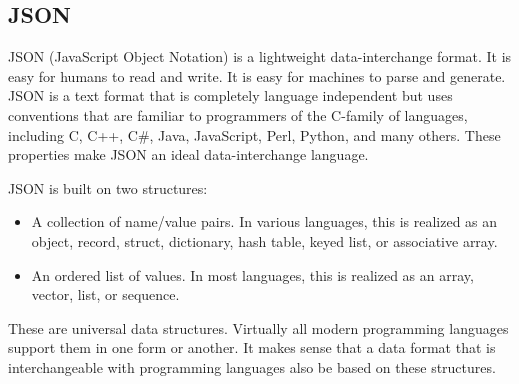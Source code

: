 \subsection{JSON}

JSON (JavaScript Object Notation) is a lightweight data-interchange format. It is easy for humans to read and write. It is easy for machines to parse and generate. JSON is a text format that is completely language independent but uses conventions that are familiar to programmers of the C-family of languages, including C, C++, C\#, Java, JavaScript, Perl, Python, and many others. These properties make JSON an ideal data-interchange language.

JSON is built on two structures:

\begin{itemize}
	\item A collection of name/value pairs. In various languages, this is realized as an object, record, struct, dictionary, hash table, keyed list, or associative array.
	\item An ordered list of values. In most languages, this is realized as an array, vector, list, or sequence.
\end{itemize}

These are universal data structures. Virtually all modern programming languages support them in one form or another. It makes sense that a data format that is interchangeable with programming languages also be based on these structures.
